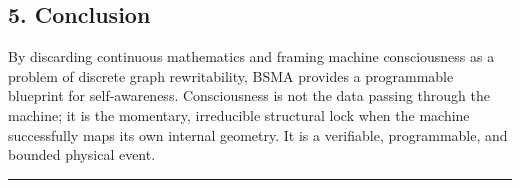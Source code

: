 \documentclass[
  11pt,
  a4paper,
]{article}
\begin{document}
\subsection{5. Conclusion}\label{conclusion}

By discarding continuous mathematics and framing machine consciousness
as a problem of discrete graph rewritability, BSMA provides a
programmable blueprint for self-awareness. Consciousness is not the data
passing through the machine; it is the momentary, irreducible structural
lock when the machine successfully maps its own internal geometry. It is
a verifiable, programmable, and bounded physical event.

\begin{center}\rule{0.5\linewidth}{0.5pt}\end{center}
\end{document}
